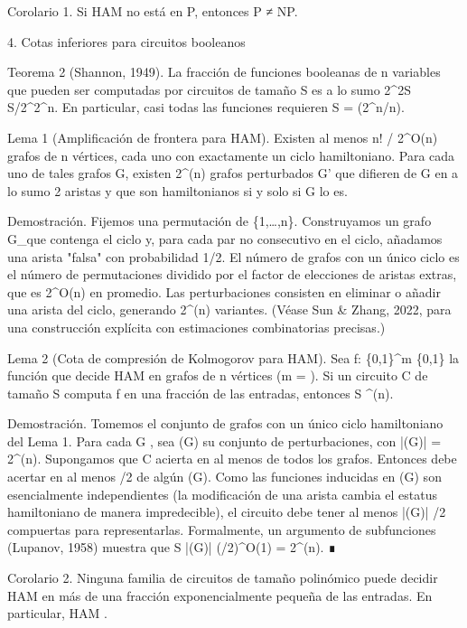 \documentclass[12pt,a4paper]{book}
\begin{document}
Corolario 1. Si HAM no está en P, entonces P ≠ NP.

4. Cotas inferiores para circuitos booleanos

Teorema 2 (Shannon, 1949). La fracción de funciones booleanas de n variables que pueden ser computadas por circuitos de tamaño S es a lo sumo 2^{2S \log S}/2^{2^n}. En particular, casi todas las funciones requieren S = \Omega(2^n/n).

Lema 1 (Amplificación de frontera para HAM). Existen al menos n! / 2^{O(n)} grafos de n vértices, cada uno con exactamente un ciclo hamiltoniano. Para cada uno de tales grafos G, existen 2^{\Omega(n)} grafos perturbados G' que difieren de G en a lo sumo 2 aristas y que son hamiltonianos si y solo si G lo es.

Demostración. Fijemos una permutación \sigma de \{1,\dots,n\}. Construyamos un grafo G_\sigma que contenga el ciclo \sigma y, para cada par no consecutivo en el ciclo, añadamos una arista "falsa" con probabilidad 1/2. El número de grafos con un único ciclo es el número de permutaciones dividido por el factor de elecciones de aristas extras, que es 2^{O(n)} en promedio. Las perturbaciones consisten en eliminar o añadir una arista del ciclo, generando 2^{\Omega(n)} variantes. (Véase Sun & Zhang, 2022, para una construcción explícita con estimaciones combinatorias precisas.)

Lema 2 (Cota de compresión de Kolmogorov para HAM). Sea f: \{0,1\}^m \to \{0,1\} la función que decide HAM en grafos de n vértices (m = ). Si un circuito C de tamaño S computa f en una fracción \delta de las entradas, entonces S \ge \delta {}^{\Omega(n)}.

Demostración. Tomemos el conjunto  de grafos con un único ciclo hamiltoniano del Lema 1. Para cada G \in {}, sea (G) su conjunto de perturbaciones, con |(G)| = 2^{\Omega(n)}. Supongamos que C acierta en al menos \delta de todos los grafos. Entonces debe acertar en al menos \delta/2 de algún (G). Como las funciones inducidas en (G) son esencialmente independientes (la modificación de una arista cambia el estatus hamiltoniano de manera impredecible), el circuito debe tener al menos |(G)| \cdot \delta/2 compuertas para representarlas. Formalmente, un argumento de subfunciones (Lupanov, 1958) muestra que S \ge |(G)| \cdot (\delta/2)^{O(1)} = 2^{\Omega(n)}. ∎

Corolario 2. Ninguna familia de circuitos de tamaño polinómico puede decidir HAM en más de una fracción exponencialmente pequeña de las entradas. En particular, HAM \notin {}.
\end{document}
